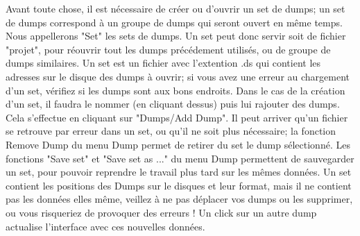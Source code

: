 Avant toute chose, il est nécessaire de créer ou d'ouvrir un set de dumps; un set de dumps correspond à un groupe de dumps qui seront ouvert en même temps. Nous appellerons "Set" les sets de dumps.
Un set peut donc servir soit de fichier "projet", pour réouvrir tout les dumps précédement utilisés, ou de groupe de dumps similaires.
Un set est un fichier avec l'extention .ds qui contient les adresses sur le disque des dumps à ouvrir; si vous avez une erreur au chargement d'un set, vérifiez si les dumps sont aux bons endroits.
Dans le cas de la création d'un set, il faudra le nommer (en cliquant dessus) puis lui rajouter des dumps. Cela s'effectue en cliquant sur "Dumps/Add Dump".
Il peut arriver qu'un fichier se retrouve par erreur dans un set, ou qu'il ne soit plus nécessaire; la fonction Remove Dump du menu Dump permet de retirer du set le dump sélectionné.
Les fonctions "Save set" et "Save set as ..." du menu Dump permettent de sauvegarder un set, pour pouvoir reprendre le travail plus tard sur les mêmes données. Un set contient les positions des Dumps sur le disques et leur format, mais il ne contient pas les données elles même, veillez à ne pas déplacer vos dumps ou les supprimer, ou vous risqueriez de provoquer des erreurs !
Un click sur un autre dump actualise l'interface avec ces nouvelles données.